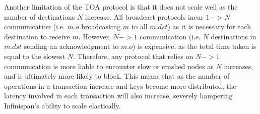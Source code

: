 	        Another limitation of the TOA protocol is that it does not scale well as the number of destinations $N$ increase.  All broadcast protocols incur $1->N$ communication (i.e. $m.o$ broadcasting $m$ to all $m.dst$) as it is necessary for each destination to receive $m$.  However, $N->1$ communication (i.e. $N$ destinations in $m.dst$ sending an acknowledgment to $m.o$) is expensive, as the total time taken is equal to the slowest $N$.  Therefore, any protocol that relies on $N->1$ communication is more liable to encounter slow or crashed nodes as $N$ increases, and is ultimately more likely to block.  This means that as the number of operations in a transaction increase and keys become more distributed, the latency involved in each transaction will also increase, severely hampering Infinispan's ability to scale elastically.  
	        


%
